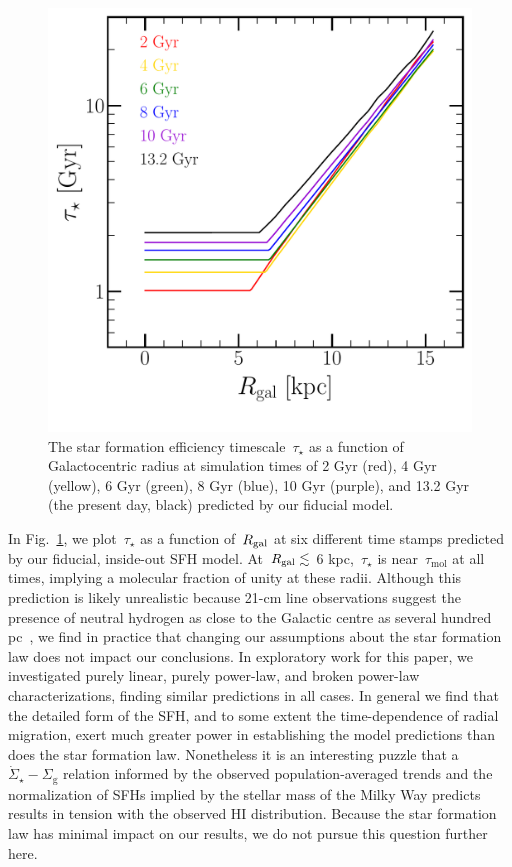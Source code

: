 \documentclass[draft2.tex]{subfiles}
\begin{document}
\begin{figure} 
\centering 
\includegraphics[scale = 0.45]{sfe.pdf} 
\caption{The star formation efficiency timescale~$\tau_\star$ as a function of 
Galactocentric radius at simulation times of 2 Gyr (red), 4 Gyr (yellow), 
6 Gyr (green), 8 Gyr (blue), 10 Gyr (purple), and 13.2 Gyr (the present day, 
black) predicted by our fiducial model. } 
\label{fig:sfe} 
\end{figure} 

In Fig.~\ref{fig:sfe}, we plot~$\tau_\star$ as a function of~$R_\text{gal}$ at 
six different time stamps predicted by our fiducial, inside-out SFH model. 
At~$R_\text{gal} \lesssim$ 6 kpc,~$\tau_\star$ is near~$\tau_\text{mol}$ at all 
times, implying a molecular fraction of unity at these radii. 
Although this prediction is likely unrealistic because 21-cm line observations 
suggest the presence of neutral hydrogen as close to the Galactic centre as 
several hundred pc~\citep{Kalberla2009}, we find in practice that changing our 
assumptions about the star formation law does not impact our conclusions. 
In exploratory work for this paper, we investigated purely linear, purely 
power-law, and broken power-law characterizations, finding similar predictions 
in all cases. 
In general we find that the detailed form of the SFH, and to some extent the 
time-dependence of radial migration, exert much greater power in establishing 
the model predictions than does the star formation law. 
Nonetheless it is an interesting puzzle that a 
$\dot{\Sigma}_\star - \Sigma_\text{g}$ relation informed by the observed 
population-averaged trends and the normalization of SFHs implied by the stellar 
mass of the Milky Way predicts results in tension with the observed HI 
distribution. 
Because the star formation law has minimal impact on our results, we do not 
pursue this question further here. 
\end{document}
